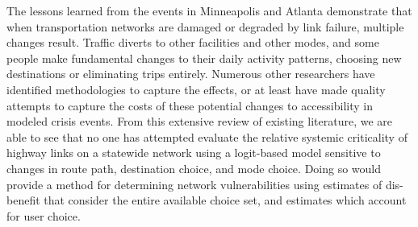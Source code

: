 The lessons learned from the events in Minneapolis and Atlanta demonstrate
that when
transportation networks are damaged or degraded by link failure, multiple
changes result. Traffic
diverts to other facilities and other modes, and some people make
fundamental changes to their
daily activity patterns, choosing new destinations or eliminating trips
entirely. Numerous other
researchers have identified methodologies to capture the effects, or at
least have made quality attempts to capture the costs of these
potential changes to accessibility in modeled crisis events.
From this extensive review of existing literature, we are able to see that no
one has attempted evaluate the relative systemic
criticality of highway links on a statewide network using a logit-based model
sensitive to changes in route path, destination choice, and mode choice. Doing so would
provide a method for determining network vulnerabilities using estimates of dis-benefit
that consider the entire available choice set, and estimates which account for user choice.
